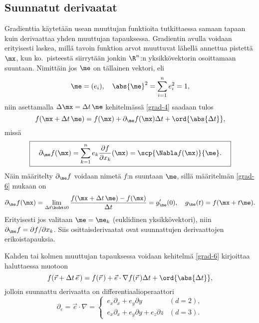 \subsection*{Suunnatut derivaatat}

Gradienttia käytetään usean muuttujan funktioita tutkittaessa samaan tapaan kuin derivaattaa
yhden muuttujan tapauksessa. Gradientin avulla voidaan erityisesti laskea, millä tavoin
funktion arvot muuttuvat lähellä annettua pistettä $\mx$, kun ko.\ pisteestä siirrytään
jonkin $\R^n$:n yksikkövektorin osoittamaan suuntaan. Nimittäin jos $\me$ on tällainen vektori,
eli
\[ 
\me = (e_i), \quad \abs{\me}^2 = \sum_{i=1}^n e_i^2 = 1, 
\]
niin asettamalla $\Delta\mx = \Delta t\,\me$ kehitelmässä \eqref{grad-4} saadaan tulos
\begin{equation} \label{grad-6}
f(\mx+\Delta t\,\me)=f(\mx)+\partial_{\me}f(\mx)\Delta t+\ord{\abs{\Delta t}},
\end{equation}
missä 
\[
\boxed{\quad \partial_{\me}f(\mx)
          =\sum_{k=1}^n e_k\frac{\partial f}{\partial x_k}(\mx)=\scp{\Nabla f(\mx)}{\me}. \quad}
\]
Näin määritelty $\partial_{\me}f$ voidaan nimetä $f$:n  suuntaan
$\me$, sillä määritelmän \eqref{grad-6} mukaan on
\[
\partial_{\me}f(\mx)=\lim_{\Delta t\kohti 0}\frac{f(\mx+\Delta t\,\me)-f(\mx)}{\Delta t} 
                    = g'_{\me}(0), \quad g_{\me}(t) = f(\mx + t\me). 
\]
Erityisesti jos valitaan $\me=\me_k$ (euklidinen yksikkövektori), niin 
$\partial_{\me}f = \partial f/\partial x_k$. Siis osittaisderivaatat ovat suunnattujen 
derivaattojen erikoistapauksia.

Kahden tai kolmen muuttujan tapauksessa voidaan kehitelmä \eqref{grad-6} kirjoittaa haluttaessa
muotoon
\[
f(\vec r+\Delta t\,\vec e\,)=f(\vec r\,)+\vec e\cdot\nabla f(\vec r\,)\Delta t+\ord{\abs{\Delta t}},
\]
jolloin suunnattu derivaatta on differentiaalioperaattori
\[
\partial_e = \vec e\cdot\nabla=\begin{cases}
\,e_x\partial_x+e_y\partial y &(d=2), \\
\,e_x\partial_x+e_y\partial y+e_z\partial z &(d=3). 
\end{cases}
\]

